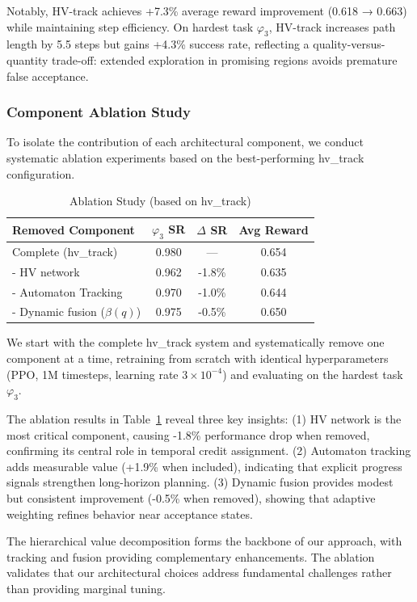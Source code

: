 \documentclass[journal]{IEEEtran}
\begin{document}
Notably, HV-track achieves +7.3\% average reward improvement (0.618 → 0.663) while maintaining step efficiency. On hardest task $\varphi_3$, HV-track increases path length by 5.5 steps but gains +4.3\% success rate, reflecting a quality-versus-quantity trade-off: extended exploration in promising regions avoids premature false acceptance.

\subsubsection{Component Ablation Study}
\label{app:ablation}

To isolate the contribution of each architectural component, we conduct systematic ablation experiments based on the best-performing hv\_track configuration.

\begin{table}[h]
\centering
\caption{Ablation Study (based on hv\_track)}
\label{tab:ablation}
\begin{tabular}{@{}lccc@{}}
	\toprule
	\textbf{Removed Component} & \textbf{$\varphi_3$ SR} & \textbf{$\Delta$ SR} & \textbf{Avg Reward} \\ \midrule
Complete (hv\_track) & 0.980 & --- & 0.654 \\
- HV network & 0.962 & -1.8\% & 0.635 \\
- Automaton Tracking & 0.970 & -1.0\% & 0.644 \\
- Dynamic fusion ($\beta(q)$) & 0.975 & -0.5\% & 0.650 \\ \bottomrule
\end{tabular}
\end{table}

We start with the complete hv\_track system and systematically remove one component at a time, retraining from scratch with identical hyperparameters (PPO, 1M timesteps, learning rate $3 \times 10^{-4}$) and evaluating on the hardest task $\varphi_3$.

The ablation results in Table~\ref{tab:ablation} reveal three key insights: (1) HV network is the most critical component, causing -1.8\% performance drop when removed, confirming its central role in temporal credit assignment. (2) Automaton tracking adds measurable value (+1.9\% when included), indicating that explicit progress signals strengthen long-horizon planning. (3) Dynamic fusion provides modest but consistent improvement (-0.5\% when removed), showing that adaptive weighting refines behavior near acceptance states.

The hierarchical value decomposition forms the backbone of our approach, with tracking and fusion providing complementary enhancements. The ablation validates that our architectural choices address fundamental challenges rather than providing marginal tuning.
\end{document}
